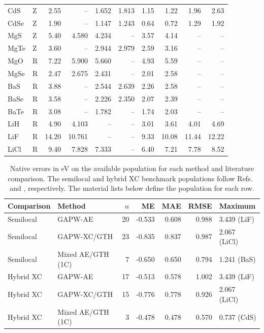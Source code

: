 \documentclass[10pt,a4paper]{article}
\begin{document}
\begin{longtable}{llrrrrrrrr}
CdS & Z & 2.55 & -- & 1.652 & 1.813 & 1.15 & 1.22 & 1.96 & 2.63 \\
CdSe & Z & 1.90 & -- & 1.147 & 1.243 & 0.64 & 0.72 & 1.29 & 1.92 \\
MgS & Z & 5.40 & 4.580 & 4.234 & -- & 3.57 & 4.14 & -- & -- \\
MgTe & Z & 3.60 & -- & 2.944 & 2.979 & 2.59 & 3.16 & -- & -- \\
MgO & R & 7.22 & 5.900 & 5.660 & -- & 4.93 & 5.59 & -- & -- \\
MgSe & R & 2.47 & 2.675 & 2.431 & -- & 2.01 & 2.58 & -- & -- \\
BaS & R & 3.88 & -- & 2.544 & 2.639 & 2.26 & 2.58 & -- & -- \\
BaSe & R & 3.58 & -- & 2.226 & 2.350 & 2.07 & 2.39 & -- & -- \\
BaTe & R & 3.08 & -- & 1.782 & -- & 1.74 & 2.03 & -- & -- \\
LiH & R & 4.90 & 4.103 & -- & -- & 3.01 & 3.61 & 4.01 & 4.69 \\
LiF & R & 14.20 & 10.761 & -- & -- & 9.33 & 10.08 & 11.44 & 12.22 \\
LiCl & R & 9.40 & 7.828 & 7.333 & -- & 6.40 & 7.21 & 7.78 & 8.52 \\
\end{longtable}
\endgroup
\begin{table}[htbp]
\centering
\caption{Native errors in eV on the available population for each method and literature comparison. The semilocal and hybrid XC benchmark populations follow Refs.~ and , respectively. The material lists below define the population for each row.}\label{tab:bandgap-native-statistics}
\begin{tabular}{llrrrrl}
\toprule
Comparison & Method & $n$ & ME & MAE & RMSE & Maximum \\
\midrule
Semilocal & GAPW-AE & 20 & -0.533 & 0.608 & 0.988 & 3.439 (LiF) \\
Semilocal & GAPW-XC/GTH & 23 & -0.835 & 0.837 & 0.987 & 2.067 (LiCl) \\
Semilocal & Mixed AE/GTH (1C) & 7 & -0.650 & 0.650 & 0.794 & 1.241 (BaS) \\
Hybrid XC & GAPW-AE & 17 & -0.513 & 0.578 & 1.002 & 3.439 (LiF) \\
Hybrid XC & GAPW-XC/GTH & 15 & -0.776 & 0.778 & 0.926 & 2.067 (LiCl) \\
Hybrid XC & Mixed AE/GTH (1C) & 3 & -0.478 & 0.478 & 0.570 & 0.737 (CdS) \\
\bottomrule
\end{tabular}
\end{table}
\FloatBarrier
\end{document}
